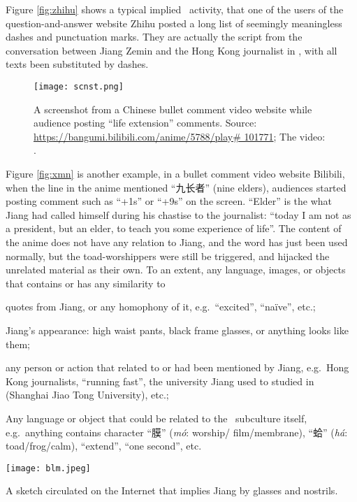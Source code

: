 Figure \vref{fig:zhihu} shows a typical implied \moha\ activity, that one of the users of the question-and-answer website Zhihu posted a long list of seemingly meaningless dashes and punctuation marks. They are actually the script from the conversation between Jiang Zemin and the Hong Kong journalist in , with all texts been substituted by dashes.
\begin{figure}[!htbp]
	\centering
	\texttt{[image: scnst.png]}
	\caption[A screenshot from a Chinese bullet comment video website while audience posting ``life extension'' comments]{A screenshot from a Chinese bullet comment video website while audience posting ``life extension'' comments. Source: \url{https://bangumi.bilibili.com/anime/5788/play\# 101771}; The video: \citet{yoshinari_blue_2017}.}
	\label{fig:xmn}
\end{figure}
Figure \vref{fig:xmn} is another example, in a bullet comment video website Bilibili, when the line in the anime mentioned ``九长者'' (nine elders), audiences started posting comment such as ``+1s'' or ``+9s'' on the screen. ``Elder'' is the what Jiang had called himself during his chastise to the journalist: ``today I am not as a president, but an elder, to teach you some experience of life''. The content of the anime does not have any relation to Jiang, and the word has just been used normally, but the toad-worshippers were still be triggered, and hijacked the unrelated material as their own. To an extent, any language, images, or objects that contains or has any similarity to
\begin{enumerate*}
	\item quotes from Jiang, or any homophony of it, e.g.\ ``excited'', ``na\" ive'', etc.;
	\item Jiang's appearance: high waist pants, black frame glasses, or anything looks like them;
	\item any person or action that related to or had been mentioned by Jiang, e.g.\ Hong Kong journalists, ``running fast'', the university Jiang used to studied in (Shanghai Jiao Tong University), etc.;
	\item Any language or object that could be related to the \moha\ subculture itself, e.g.\ anything contains character ``膜'' (\textit{m\'o}: worship/ film/membrane), ``蛤'' (\textit{h\'a}: toad/frog/calm), ``extend'', ``one second'', etc.
\end{enumerate*}
\begin{marginfigure}
	\texttt{[image: blm.jpeg]}
	\caption[A sketch circulated on the Internet that implies Jiang by glasses and nostrils]{A sketch circulated on the Internet that implies Jiang by glasses and nostrils.}
	\label{fig:simplemo}
\end{marginfigure}

